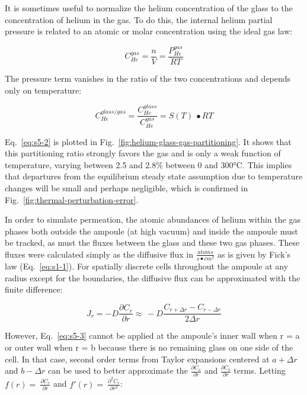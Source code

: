 It is sometimes useful to normalize the helium concentration of the
glass to the concentration of helium in the gas. To do this, the
internal helium partial pressure is related to an atomic or molar
concentration using the ideal gas law:

\[
C_{He}^{gas} = \frac{n}{V} = \frac{P_{He}^{gas}}{RT}
\]

The pressure term vanishes in the ratio of the two concentrations and
depends only on temperature:

\begin{equation}
C_{He}^{glass/gas} = \frac{C_{He}^{glass}}{C_{He}^{gas}} = S(T)\  \bullet RT
\label{eq:s5-2}
\end{equation}

Eq.~\eqref{eq:s5-2} is plotted in Fig.~\ref{fig:helium-glass-gas-partitioning}. It shows that this partitioning ratio
strongly favors the gas and is only a weak function of temperature,
varying between 2.5 and 2.8\% between 0 and 300°C. This implies that
departures from the equilibrium steady state assumption due to
temperature changes will be small and perhaps negligible, which is
confirmed in Fig.~\ref{fig:thermal-perturbation-error}.

In order to simulate permeation, the atomic abundances of helium within
the gas phases both outside the ampoule (at high vacuum) and inside the
ampoule must be tracked, as must the fluxes between the glass and these
two gas phases. These fluxes were calculated simply as the diffusive
flux in \(\frac{atoms}{s \bullet cm^{2}}\) as is given by Fick's law
(Eq.~\eqref{eq:s1-1}). For spatially discrete cells throughout the ampoule at any
radius except for the boundaries, the diffusive flux can be approximated
with the finite difference:

\begin{equation}
J_{r} = - D\frac{\partial C_{r}}{\partial r} \approx \  - D\frac{C_{r + \Delta r} - C_{r - \Delta r}}{2\Delta r}
\label{eq:s5-3}
\end{equation}

However, Eq.~\eqref{eq:s5-3} cannot be applied at the ampoule's inner wall when r
= a or outer wall when r = b because there is no remaining glass on one
side of the cell. In that case, second order terms from Taylor
expansions centered at \(a + \Delta r\ \)and \(b - \Delta r\) can be
used to better approximate the \(\frac{\partial C_{a}}{\partial r}\) and
\(\frac{\partial C_{b}}{\partial r}\) terms. Letting
\(f(r) = \ \frac{\partial C_{r}}{\partial r}\) and
\(f'(r) = \ \frac{\partial^{2}C_{r}}{\partial r^{2}}\):

